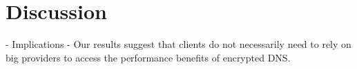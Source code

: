 \section{Discussion}\label{sec:discussion}
- Implications
	- Our results suggest that clients do not necessarily need to rely on big providers to access the performance benefits of encrypted DNS. 
